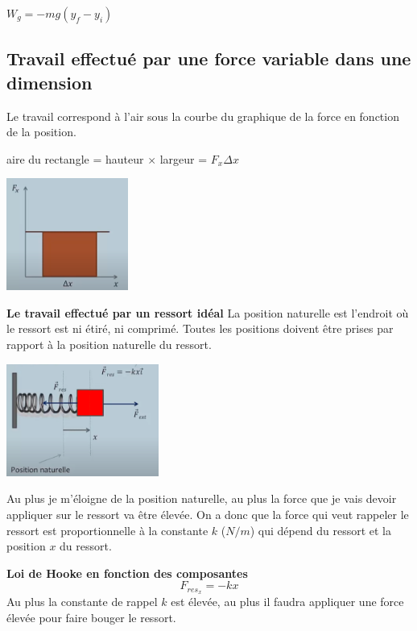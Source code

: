 \documentclass{article}
\begin{document}
$W_g = -mg(y_f - y_i)$

\subsection{Travail effectué par une force variable dans une dimension}
Le travail correspond à l'air sous la courbe du graphique de la force en fonction de la position.
\newline

aire du rectangle = hauteur $\times$ largeur = $F_x\Delta x$

 \includegraphics[width=4cm]{Image/FrocePosition.png}
\newline

\noindent
\textbf{Le travail effectué par un ressort idéal}
\newline
\noindent
La position naturelle est l'endroit où le ressort est ni étiré, ni comprimé. Toutes les positions doivent être prises par rapport à la position naturelle du ressort.
\newline

 \includegraphics[width=5cm]{Image/Ressort.png}
\newline

Au plus je m'éloigne de la position naturelle, au plus la force que je vais devoir appliquer sur le ressort va être élevée. On a donc que la force qui veut rappeler le ressort est proportionnelle à la constante $k$ ($N/m$) qui dépend du ressort et la position $x$ du ressort.
\newline

\noindent
\textbf{Loi de Hooke en fonction des composantes}
\[F_{res_x} = -kx\]
\newline
Au plus la constante de rappel $k$ est élevée, au plus il faudra appliquer une force élevée pour faire bouger le ressort.
\newline
\end{document}

